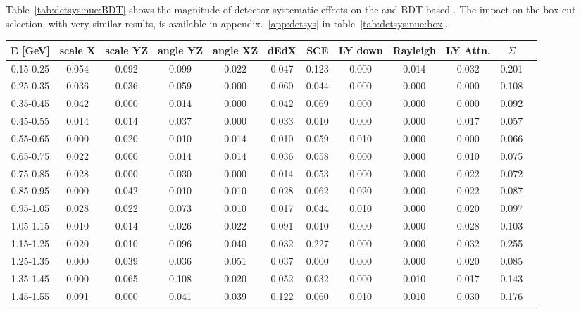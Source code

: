 \par Table~\ref{tab:detsys:nue:BDT} shows the magnitude of detector systematic effects on the and BDT-based \npsel. The impact on the box-cut selection, with very similar results, is available in appendix.~\ref{app:detsys} in table~\ref{tab:detsys:nue:box}.


\begin{table}[H]
\centering
\small
\setlength{\tabcolsep}{3pt}
\renewcommand{\arraystretch}{1.25}
 \begin{tabular}{| c | c | c | c | c | c | c | c | c | c | c | c |} 
 \hline
E [GeV] & scale X & scale YZ & angle YZ & angle XZ & dEdX & SCE & LY down & Rayleigh & LY Attn. & $\Sigma$ \\ \hline
0.15-0.25 & 0.054 & 0.092 & 0.099 & 0.022 & 0.047 & 0.123 & 0.000 & 0.014 & 0.032 &  0.201 \\
0.25-0.35 & 0.036 & 0.036 & 0.059 & 0.000 & 0.060 & 0.044 & 0.000 & 0.000 & 0.000 &  0.108 \\
0.35-0.45 & 0.042 & 0.000 & 0.014 & 0.000 & 0.042 & 0.069 & 0.000 & 0.000 & 0.000 &  0.092 \\
0.45-0.55 & 0.014 & 0.014 & 0.037 & 0.000 & 0.033 & 0.010 & 0.000 & 0.000 & 0.017 &  0.057 \\
0.55-0.65 & 0.000 & 0.020 & 0.010 & 0.014 & 0.010 & 0.059 & 0.010 & 0.000 & 0.000 &  0.066 \\
0.65-0.75 & 0.022 & 0.000 & 0.014 & 0.014 & 0.036 & 0.058 & 0.000 & 0.000 & 0.010 &  0.075 \\
0.75-0.85 & 0.028 & 0.000 & 0.030 & 0.000 & 0.014 & 0.053 & 0.000 & 0.000 & 0.022 &  0.072 \\
0.85-0.95 & 0.000 & 0.042 & 0.010 & 0.010 & 0.028 & 0.062 & 0.020 & 0.000 & 0.022 &  0.087 \\
0.95-1.05 & 0.028 & 0.022 & 0.073 & 0.010 & 0.017 & 0.044 & 0.010 & 0.000 & 0.020 &  0.097 \\
1.05-1.15 & 0.010 & 0.014 & 0.026 & 0.022 & 0.091 & 0.010 & 0.000 & 0.000 & 0.028 &  0.103 \\
1.15-1.25 & 0.020 & 0.010 & 0.096 & 0.040 & 0.032 & 0.227 & 0.000 & 0.000 & 0.032 &  0.255 \\
1.25-1.35 & 0.000 & 0.039 & 0.036 & 0.051 & 0.037 & 0.000 & 0.000 & 0.000 & 0.020 &  0.085 \\
1.35-1.45 & 0.000 & 0.065 & 0.108 & 0.020 & 0.052 & 0.032 & 0.000 & 0.010 & 0.017 &  0.143 \\
1.45-1.55 & 0.091 & 0.000 & 0.041 & 0.039 & 0.122 & 0.060 & 0.010 & 0.010 & 0.030 &  0.176 \\

\end{tabular}
\end{table}
